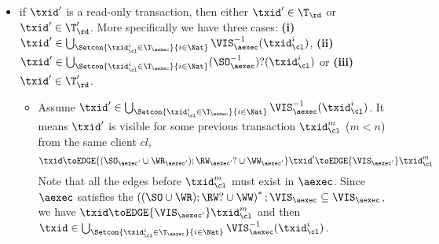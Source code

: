 \begin{itemize}
\begin{itemize}
\begin{itemize}
        \begin{equation}
        \label{equ:cp-dagger}
        \dagger  \equiv 
            \fora{\key, \key', i, j}
                i \in \vi(\key)  \wedge \WTx(\mkvs(\key', j)) \toEDGE{(((\SO \cup \WR_{\mkvs}) ; \RW_{\mkvs}?) \cup \WW_{\mkvs})^{+}} \WTx(\mkvs(\key, i))
            \implies j \in \vi(\key')  
        \end{equation}
        Since \( \WR_\mkvs \), \( \WW_\mkvs \) and \( \RW_\mkvs \) coincide with
        \( \WR_\aexec \), \( \WW_\aexec \) and \( \RW_\aexec \) respectively.
        Also because \( \txid \) write to at least one key,
        it is easy to see there exists some version \( \key'',m\) such that 
        \( \txid = \WTx(\mkvs(\key'',m))\) and \( m \in \vi(\key'')\).
        By definition of \( \Tx \), it follows \( \txid \in \Tx(\mkvs, \vi) \).
        \item if \( \txid \) is a read-only transaction, we add it into \( \T'_\rd \).
    \end{itemize}
    \item 
    if \( \txid' \) is a read-only transaction, then either \( \txid' \in \T_\rd \) or \( \txid' \in \T'_\rd \).
    More specifically we have three cases: \textbf{(i)} \( \txid' \in \bigcup_{\Setcon{\txid_{\cl}^{i} \in \T_{\aexec} }{ i \in \Nat }} \VIS_{\aexec}^{-1}(\txid^i_\cl) \), \textbf{(ii)} \( \txid' \in \bigcup_{\Setcon{\txid_{\cl}^{i} \in \T_{\aexec} }{ i \in \Nat }} (\SO_{\aexec}^{-1})?(\txid^i_\cl) \) or \textbf{(iii)} \( \txid' \in \T'_\rd\).
    \begin{itemize}
        \item
            Assume \( \txid' \in \bigcup_{\Setcon{\txid_{\cl}^{i} \in \T_{\aexec} }{ i \in \Nat }} \VIS_{\aexec}^{-1}(\txid^i_\cl) \).
        It means \( \txid' \) is visible for some previous transaction \( \txid_\cl^m \) (\( m < n \)) from the same client \( cl \), 
        \ie 
        \[ 
            \txid \toEDGE{(\SO_{\aexec'} \cup \WR_{\aexec'} ) ; \RW_{\aexec'}? \cup \WW_{\aexec'}} \txid' \toEDGE{\VIS_{\aexec'}}  \txid_\cl^m 
        \]
        Note that all the edges before \( \txid_\cl^m \) must exist in \( \aexec \).
        Since \( \aexec \) satisfies the \( \left( (\SO \cup \WR ) ; \RW? \cup \WW \right)^* ; \VIS_\aexec \subseteq \VIS_\aexec \),
        we have \( \txid \toEDGE{\VIS_{\aexec'}} \txid_\cl^m \) and then \( \txid \in \bigcup_{\Setcon{\txid_{\cl}^{i} \in \T_{\aexec} }{ i \in \Nat }} \VIS_{\aexec}^{-1}(\txid^i_\cl)\).

\end{itemize}
\end{itemize}
\end{itemize}
